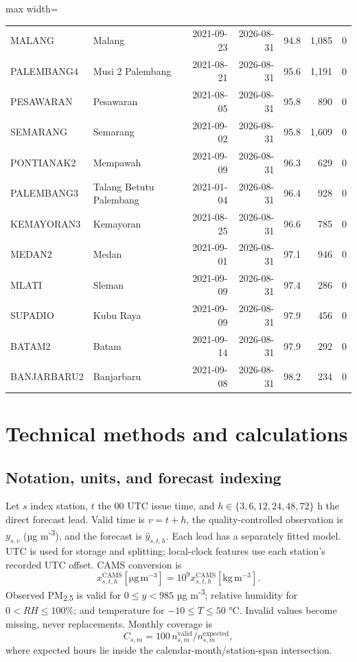 \documentclass[11pt,a4paper]{article}
\begin{document}
\begin{landscape}
\begin{table}[H]
\begin{adjustbox}{max width=\linewidth}
\begin{tabular}{llrrrrr}
MALANG & Malang & 2021-09-23 & 2026-08-31 & 94.8 & 1,085 & 0 \\
PALEMBANG4 & Musi 2 Palembang & 2021-08-21 & 2026-08-31 & 95.6 & 1,191 & 0 \\
PESAWARAN & Pesawaran & 2021-08-05 & 2026-08-31 & 95.8 & 890 & 0 \\
SEMARANG & Semarang & 2021-09-02 & 2026-08-31 & 95.8 & 1,609 & 0 \\
PONTIANAK2 & Mempawah & 2021-09-09 & 2026-08-31 & 96.3 & 629 & 0 \\
PALEMBANG3 & Talang Betutu Palembang & 2021-01-04 & 2026-08-31 & 96.4 & 928 & 0 \\
KEMAYORAN3 & Kemayoran & 2021-08-25 & 2026-08-31 & 96.6 & 785 & 0 \\
MEDAN2 & Medan & 2021-09-01 & 2026-08-31 & 97.1 & 946 & 0 \\
MLATI & Sleman & 2021-09-09 & 2026-08-31 & 97.4 & 286 & 0 \\
SUPADIO & Kubu Raya & 2021-09-09 & 2026-08-31 & 97.9 & 456 & 0 \\
BATAM2 & Batam & 2021-09-14 & 2026-08-31 & 97.9 & 292 & 0 \\
BANJARBARU2 & Banjarbaru & 2021-09-08 & 2026-08-31 & 98.2 & 234 & 0 \\
\bottomrule
\end{tabular}
\end{adjustbox}
\end{table}
\end{landscape}


\appendix
\section{Technical methods and calculations}
\subsection{Notation, units, and forecast indexing}
Let $s$ index station, $t$ the 00 UTC issue time, and $h\in\{3,6,12,24,48,72\}$ h the direct forecast lead. Valid time is $v=t+h$, the quality-controlled observation is $y_{s,v}$ (µg m\textsuperscript{-3}), and the forecast is $\hat y_{s,t,h}$. Each lead has a separately fitted model. UTC is used for storage and splitting; local-clock features use each station's recorded UTC offset. CAMS conversion is
\begin{equation}
x^{\mathrm{CAMS}}_{s,t,h}[\mathrm{\mu g\,m^{-3}}]=10^9x^{\mathrm{CAMS}}_{s,t,h}[\mathrm{kg\,m^{-3}}].
\end{equation}
Observed PM\textsubscript{2.5} is valid for $0\le y<985$ µg m\textsuperscript{-3}; relative humidity for $0<RH\le100$\%; and temperature for $-10\le T\le50$ °C. Invalid values become missing, never replacements. Monthly coverage is
\begin{equation} C_{s,m}=100\,n^{\mathrm{valid}}_{s,m}/n^{\mathrm{expected}}_{s,m}, \end{equation}
where expected hours lie inside the calendar-month/station-span intersection.
\end{document}
